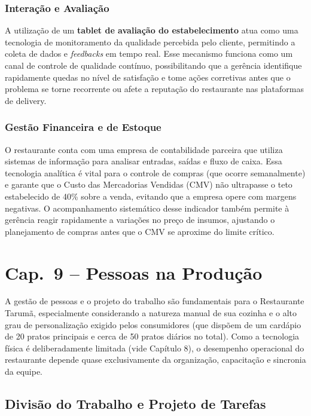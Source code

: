 \documentclass[12pt, a4paper]{article}
\begin{document}
\subsubsection{Interação e Avaliação}
A utilização de um \textbf{tablet de avaliação do estabelecimento} atua como uma tecnologia de monitoramento da qualidade percebida pelo cliente, permitindo a coleta de dados e \textit{feedbacks} em tempo real. Esse mecanismo funciona como um canal de controle de qualidade contínuo, possibilitando que a gerência identifique rapidamente quedas no nível de satisfação e tome ações corretivas antes que o problema se torne recorrente ou afete a reputação do restaurante nas plataformas de delivery.

\subsubsection{Gestão Financeira e de Estoque}
O restaurante conta com uma empresa de contabilidade parceira que utiliza sistemas de informação para analisar entradas, saídas e fluxo de caixa. Essa tecnologia analítica é vital para o controle de compras (que ocorre semanalmente) e garante que o Custo das Mercadorias Vendidas (CMV) não ultrapasse o teto estabelecido de 40\% sobre a venda, evitando que a empresa opere com margens negativas. O acompanhamento sistemático desse indicador também permite à gerência reagir rapidamente a variações no preço de insumos, ajustando o planejamento de compras antes que o CMV se aproxime do limite crítico.

\section{Cap.~9 – Pessoas na Produção}

A gestão de pessoas e o projeto do trabalho são fundamentais para o Restaurante Tarumã, especialmente considerando a natureza manual de sua cozinha e o alto grau de personalização exigido pelos consumidores (que dispõem de um cardápio de 20 pratos principais e cerca de 50 pratos diários no total). Como a tecnologia física é deliberadamente limitada (vide Capítulo 8), o desempenho operacional do restaurante depende quase exclusivamente da organização, capacitação e sincronia da equipe.

\subsection{Divisão do Trabalho e Projeto de Tarefas}
\end{document}
